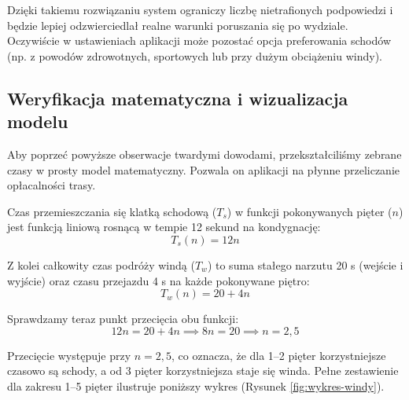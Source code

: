 \documentclass[14pt,a4paper]{extarticle}
\begin{document}
Dzięki takiemu rozwiązaniu system ograniczy liczbę nietrafionych podpowiedzi i będzie lepiej odzwierciedlał realne warunki poruszania się po wydziale. Oczywiście w ustawieniach aplikacji może pozostać opcja preferowania schodów (np. z powodów zdrowotnych, sportowych lub przy dużym obciążeniu windy).

\subsection{Weryfikacja matematyczna i wizualizacja modelu}

Aby poprzeć powyższe obserwacje twardymi dowodami, przekształciliśmy zebrane czasy w prosty model matematyczny. Pozwala on aplikacji na płynne przeliczanie opłacalności trasy.

Czas przemieszczania się klatką schodową ($T_s$) w funkcji pokonywanych pięter ($n$) jest funkcją liniową rosnącą w tempie 12 sekund na kondygnację:
\begin{equation}
    T_s(n) = 12n
\end{equation}

Z kolei całkowity czas podróży windą ($T_w$) to suma stałego narzutu 20 s (wejście i wyjście) oraz czasu przejazdu 4 s na każde pokonywane piętro:
\begin{equation}
    T_w(n) = 20 + 4n
\end{equation}

Sprawdzamy teraz punkt przecięcia obu funkcji:
\begin{equation}
    12n = 20 + 4n \implies 8n = 20 \implies n = 2{,}5
\end{equation}

Przecięcie występuje przy $n=2{,}5$, co oznacza, że dla 1--2 pięter korzystniejsze czasowo są schody, a od 3 pięter korzystniejsza staje się winda. Pełne zestawienie dla zakresu 1--5 pięter ilustruje poniższy wykres (Rysunek \ref{fig:wykres-windy}).
\end{document}
